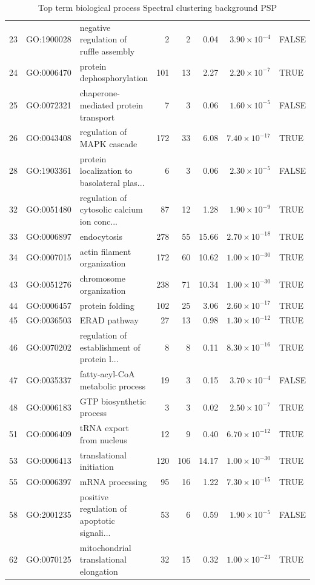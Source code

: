 \begin{table}[ht]
\begin{adjustbox}{max width=\textwidth}
\begin{tabular}{lllrrrrl}
  23 & GO:1900028 & negative regulation of ruffle assembly & 2 & 2 & 0.04 & $3.90 \times 10^{-4}$ & FALSE \\ 
  24 & GO:0006470 & protein dephosphorylation & 101 & 13 & 2.27 & $2.20 \times 10^{-7}$ & TRUE \\ 
  25 & GO:0072321 & chaperone-mediated protein transport & 7 & 3 & 0.06 & $1.60 \times 10^{-5}$ & FALSE \\ 
  26 & GO:0043408 & regulation of MAPK cascade & 172 & 33 & 6.08 & $7.40 \times 10^{-17}$ & TRUE \\ 
  28 & GO:1903361 & protein localization to basolateral plas... & 6 & 3 & 0.06 & $2.30 \times 10^{-5}$ & FALSE \\ 
  32 & GO:0051480 & regulation of cytosolic calcium ion conc... & 87 & 12 & 1.28 & $1.90 \times 10^{-9}$ & TRUE \\ 
  33 & GO:0006897 & endocytosis & 278 & 55 & 15.66 & $2.70 \times 10^{-18}$ & TRUE \\ 
  34 & GO:0007015 & actin filament organization & 172 & 60 & 10.62 & $1.00 \times 10^{-30}$ & TRUE \\ 
  43 & GO:0051276 & chromosome organization & 238 & 71 & 10.34 & $1.00 \times 10^{-30}$ & TRUE \\ 
  44 & GO:0006457 & protein folding & 102 & 25 & 3.06 & $2.60 \times 10^{-17}$ & TRUE \\ 
  45 & GO:0036503 & ERAD pathway & 27 & 13 & 0.98 & $1.30 \times 10^{-12}$ & TRUE \\ 
  46 & GO:0070202 & regulation of establishment of protein l... & 8 & 8 & 0.11 & $8.30 \times 10^{-16}$ & TRUE \\ 
  47 & GO:0035337 & fatty-acyl-CoA metabolic process & 19 & 3 & 0.15 & $3.70 \times 10^{-4}$ & FALSE \\ 
  48 & GO:0006183 & GTP biosynthetic process & 3 & 3 & 0.02 & $2.50 \times 10^{-7}$ & TRUE \\ 
  51 & GO:0006409 & tRNA export from nucleus & 12 & 9 & 0.40 & $6.70 \times 10^{-12}$ & TRUE \\ 
  53 & GO:0006413 & translational initiation & 120 & 106 & 14.17 & $1.00 \times 10^{-30}$ & TRUE \\ 
  55 & GO:0006397 & mRNA processing & 95 & 16 & 1.22 & $7.30 \times 10^{-15}$ & TRUE \\ 
  58 & GO:2001235 & positive regulation of apoptotic signali... & 53 & 6 & 0.59 & $1.90 \times 10^{-5}$ & FALSE \\ 
  62 & GO:0070125 & mitochondrial translational elongation & 32 & 15 & 0.32 & $1.00 \times 10^{-23}$ & TRUE \\ 
   \hline
\end{tabular}
\end{adjustbox}
\caption{Top term biological process Spectral clustering background PSP} 
\label{tab:Top term biological process spectral clustering background PSP}
\end{table}

